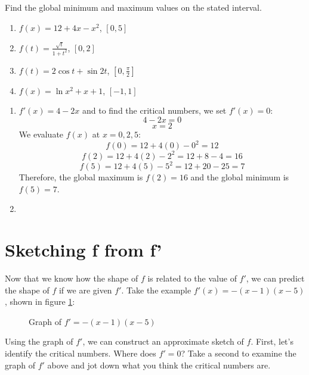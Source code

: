 \begin{Exercise}[label=gloext2]
Find the global minimum and maximum values on the stated interval.
\begin{enumerate}
	\item $f(x) = 12+4x-x^2$, $[0,5]$
	\item $f(t) = \frac{\sqrt{t}}{1+t^2}$, $[0, 2]$
	\item $f(t) = 2\cos{t} + \sin{2t}$, $[0, \frac{\pi}{2}]$
	\item $f(x) = \ln{x^2+x+1}$, $[-1, 1]$
\end{enumerate}
\end{Exercise}

\begin{Answer}[ref=gloext2]
\begin{enumerate}
	\item $f'(x) = 4-2x$ and to find the critical numbers, we set $f'(x)=0$:
$$4-2x=0$$
$$x=2$$
We evaluate $f(x)$ at $x=0, 2, 5$:
$$f(0) = 12+4(0)-0^2=12$$
$$f(2) = 12+4(2)-2^2=12+8-4=16$$
$$f(5) = 12+4(5)-5^2=12+20-25=7$$
Therefore, the global maximum is $f(2) = 16$ and the global minimum is $f(5) = 7$.
\item %
\end{enumerate}
\end{Answer}

\section{Sketching f from f'}
Now that we know how the shape of $f$ is related to the value of $f'$, we can 
predict the shape of $f$ if we are given $f'$. Take the example $f'(x) = -(x-1)
(x-5)$, shown in figure \ref{fig:sketchf1}:

\begin{figure}[htbp]
	\centering
	\caption{Graph of $f'=-(x-1)(x-5)$}
	\label{fig:sketchf1}
\end{figure}

Using the graph of $f'$, we can construct an approximate sketch of $f$. First, 
let's identify the critical numbers. Where does $f'=0$? Take a second to 
examine the graph of $f'$ above and jot down what you think the critical 
numbers are.

